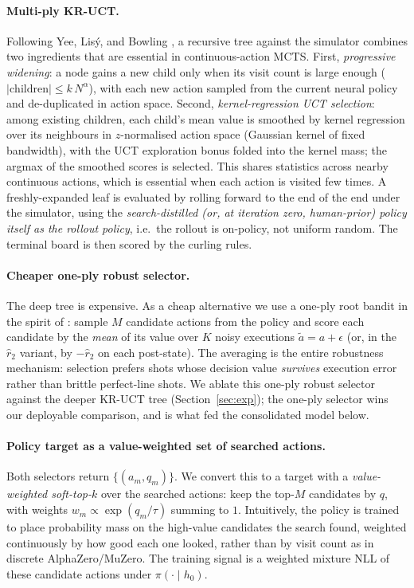 \documentclass[11pt]{article}
\begin{document}
\paragraph{Multi-ply KR-UCT.}
Following Yee, Lis\'y, and Bowling \cite{yee2016monte}, a recursive tree
against the simulator combines two ingredients that are essential in
continuous-action MCTS. First, \emph{progressive widening}: a node gains a
new child only when its visit count is large enough
($|\text{children}|\le k\,N^{\alpha}$), with each new action sampled from
the current neural policy and de-duplicated in action space. Second,
\emph{kernel-regression UCT selection}: among existing children, each
child's mean value is smoothed by kernel regression over its neighbours in
$z$-normalised action space (Gaussian kernel of fixed bandwidth), with the
UCT exploration bonus folded into the kernel mass; the argmax of the
smoothed scores is selected. This shares statistics across nearby continuous
actions, which is essential when each action is visited few times. A
freshly-expanded leaf is evaluated by rolling forward to the end of the end
under the simulator, using the \emph{search-distilled (or, at iteration
zero, human-prior) policy itself as the rollout policy}, i.e.\ the rollout
is on-policy, not uniform random. The terminal board is then scored by the
curling rules.

\paragraph{Cheaper one-ply robust selector.}
The deep tree is expensive. As a cheap alternative we use a one-ply root
bandit in the spirit of \cite{yee2016monte}: sample $M$ candidate actions
from the policy and score each candidate by the \emph{mean} of its value
over $K$ noisy executions $\tilde a = a+\epsilon$ (or, in the $\hat r_2$
variant, by $-\hat r_2$ on each post-state). The averaging is the entire
robustness mechanism: selection prefers shots whose decision value
\emph{survives} execution error rather than brittle perfect-line shots. We
ablate this one-ply robust selector against the deeper KR-UCT tree
(Section~\ref{sec:exp}); the one-ply selector wins our deployable
comparison, and is what fed the consolidated model below.

\paragraph{Policy target as a value-weighted set of searched actions.}
Both selectors return $\{(a_m, q_m)\}$. We convert this to a target with a
\emph{value-weighted soft-top-$k$} over the searched actions: keep the
top-$M$ candidates by $q$, with weights $w_m \propto \exp(q_m/\tau)$ summing
to $1$. Intuitively, the policy is trained to place probability mass on the
high-value candidates the search found, weighted continuously by how good
each one looked, rather than by visit count as in discrete AlphaZero/MuZero.
The training signal is a weighted mixture NLL of these candidate actions
under $\pi(\cdot\mid h_0)$.
\end{document}

